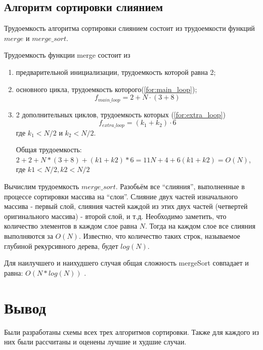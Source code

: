 \subsection{Алгоритм сортировки слиянием}

Трудоемкость алгоритма сортировки слиянием состоит из трудоемкости функций $merge$ и $merge\_sort$.

Трудоемкость функции merge состоит из
\begin{enumerate}
	\item предварительной инициализации, трудоемкость которой равна 2;
	\item основного цикла, трудоемкость которого(\ref{for:main_loop});
	\begin{equation}
		\label{for:main_loop}
		f_{main\_loop} = 2 + N\cdot(3 + 8)
	\end{equation}
	\item 2 дополнительных циклов, трудоемкость которых (\ref{for:extra_loop})
	\begin{equation}
		\label{for:extra_loop}
		f_{extra\_loop} = (k_1 + k_2)\cdot6
	\end{equation}
	где $k_1 < N/2$ и $k_2 < N/2$.
	
	Общая трудоемкость:  $2 + 2 + N * (3 + 8) + (k1 + k2) * 6 = 11N + 4  + 6(k1 + k2) = O(N)$, где $k1 < N/2, k2  < N/2$
\end{enumerate}

Вычислим трудоемкость $merge\_sort$. Разобьём все “слияния”, выполненные в процессе сортировки массива на “слои”. Слияние двух частей изначального массива - первый слой, слияния частей каждой из этих двух частей (четвертей оригинального массива) - второй слой, и т.д. Необходимо заметить, что количество элементов в каждом слое равна $N$. Тогда на каждом слое все слияния выполняются за $O(N)$. Известно, что количество таких строк, называемое глубиной рекурсивного дерева, будет $log(N)$.

Для наилучшего и наихудшего случая общая сложность mergeSort совпадает и равна: $O(N * log(N))$ \cite{algos}.


\section*{Вывод}

Были разработаны схемы всех трех алгоритмов сортировки. Также для каждого из них были рассчитаны и оценены лучшие и худшие случаи.
